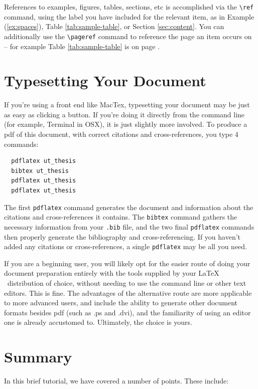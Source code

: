 References to examples, figures, tables, sections, etc is accomplished via the
\verb+\ref+ command, using the label you have included for the relevant item,
as in Example (\ref{ex:spaces}), Table \ref{tab:sample-table}, or Section
\ref{sec:content}. You can additionally use the \verb+\pageref+ command to
reference the page an item occurs on -- for example Table \ref{tab:sample-table}
is on page \pageref{tab:sample-table}.

\section{Typesetting Your Document}

If you're using a front end like MacTex, typesetting your document may be
just as easy as clicking a button. If you're doing it directly from the 
command line (for example, Terminal in OSX), it is just slightly more involved.
To produce a pdf of this document, with correct citations and cross-references,
you type 4 commands:

\begin{verbatim}
  pdflatex ut_thesis
  bibtex ut_thesis
  pdflatex ut_thesis
  pdflatex ut_thesis
\end{verbatim}
%
The first {\tt pdflatex} command generates the document and information 
about the citations and cross-references it contains. The {\tt bibtex} command 
gathers the necessary information from your {\tt .bib} file, and the two final
{\tt pdflatex} commands then properly generate the bibliography and
cross-referencing. If you haven't added any citations or cross-references,
a single {\tt pdflatex} may be all you need.

If you are a beginning user, you will likely opt for the easier route of doing
your document preparation entirely with the tools supplied by your \LaTeX
~distribution of choice, without needing to use the command line or other text
editors. This is fine. The advantages of the alternative route are more
applicable to more advanced users, and include the ability to generate other
document formats besides pdf (such as .ps and .dvi), and the familiarity of
using an editor one is already accustomed to. Ultimately, the choice is yours.

\section{Summary}
In this brief tutorial, we have covered a number of points. These include:

